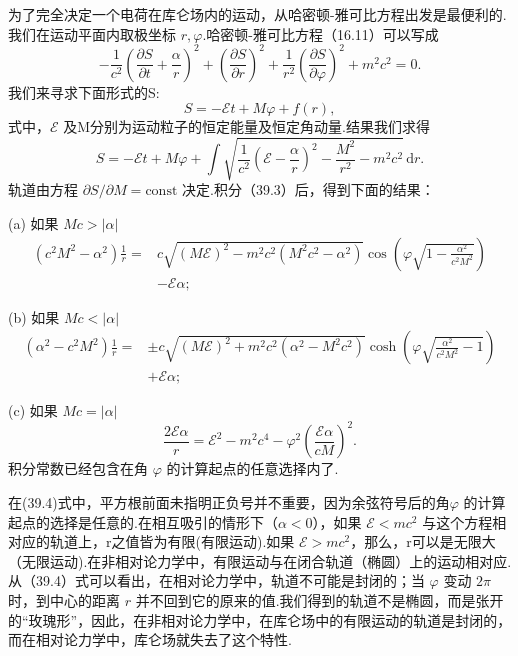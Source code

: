 为了完全决定一个电荷在库仑场内的运动，从哈密顿-雅可比方程出发是最便利的.我们在运动平面内取极坐标 $r,\varphi$.哈密顿-雅可比方程（16.11）可以写成
\begin{equation*}
  -\frac{1}{c^2}\left(\frac{\partial S}{\partial t}+\frac{\alpha}{r}\right)^2
  +\left(\frac{\partial S}{\partial r}\right)^2
  +\frac{1}{r^2}\left(\frac{\partial S}{\partial\varphi}\right)^2
  +m^2c^2=0.
\end{equation*}
我们来寻求下面形式的S:
\begin{equation*}
  S=-\mathcal{E}t+M\varphi+f(r),
\end{equation*}
式中，$\mathcal{E}$ 及M分别为运动粒子的恒定能量及恒定角动量.结果我们求得
\begin{equation}
  S=-\mathcal{E}t+M\varphi
  +\int\sqrt{\frac{1}{c^2}\left(\mathcal{E}-\frac{\alpha}{r}\right)^2
  -\frac{M^2}{r^2}-m^2c^2}\,\mathrm{d}r.
\end{equation}
轨道由方程 $\partial S/\partial M=\mathrm{const}$ 决定.积分（39.3）后，得到下面的结果：

(a) 如果 $Mc>|\alpha|$
\begin{equation}
\begin{aligned}
  \left(c^2M^2-\alpha^2\right)\frac{1}{r}={}&
  c\sqrt{(M\mathcal{E})^2-m^2c^2(M^2c^2-\alpha^2)}
  \cos\left(\varphi\sqrt{1-\frac{\alpha^2}{c^2M^2}}\right)\\
  &-\mathcal{E}\alpha;
\end{aligned}
\end{equation}

(b) 如果 $Mc<|\alpha|$
\begin{equation}
\begin{aligned}
  \left(\alpha^2-c^2M^2\right)\frac{1}{r}={}&
  \pm c\sqrt{(M\mathcal{E})^2+m^2c^2(\alpha^2-M^2c^2)}
  \cosh\left(\varphi\sqrt{\frac{\alpha^2}{c^2M^2}-1}\right)\\
  &+\mathcal{E}\alpha;
\end{aligned}
\end{equation}

(c) 如果 $Mc=|\alpha|$
\begin{equation}
  \frac{2\mathcal{E}\alpha}{r}
  =\mathcal{E}^2-m^2c^4-\varphi^2\left(\frac{\mathcal{E}\alpha}{cM}\right)^2.
\end{equation}
积分常数已经包含在角 $\varphi$ 的计算起点的任意选择内了.

在(39.4)式中，平方根前面未指明正负号并不重要，因为余弦符号后的角$\varphi$ 的计算起点的选择是任意的.在相互吸引的情形下（$\alpha < 0$），如果 $\mathcal{E}<mc^2$ 与这个方程相对应的轨道上，r之值皆为有限(有限运动).如果 $\mathcal{E}>mc^2$，那么，r可以是无限大（无限运动).在非相对论力学中，有限运动与在闭合轨道（椭圆）上的运动相对应.从（39.4）式可以看出，在相对论力学中，轨道不可能是封闭的；当 $\varphi$ 变动 $2\pi$ 时，到中心的距离 $r$ 并不回到它的原来的值.我们得到的轨道不是椭圆，而是张开的“玫瑰形”，因此，在非相对论力学中，在库仑场中的有限运动的轨道是封闭的，而在相对论力学中，库仑场就失去了这个特性.

